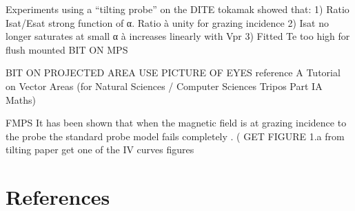 \documentclass[12pt]{article}
\begin{document}
Experiments using a “tilting probe” on
the DITE tokamak showed that:
1) Ratio Isat/Esat strong function of α.
Ratio à unity for grazing incidence
2) Isat no longer saturates at small α à
increases linearly with Vpr
3) Fitted Te too high for flush mounted
BIT ON MPS
 
BIT ON PROJECTED AREA USE PICTURE OF EYES reference A Tutorial on Vector Areas
(for Natural Sciences / Computer Sciences Tripos Part IA Maths) 

FMPS 
It has been shown that when the magnetic field is at grazing incidence to the probe the standard probe model fails completely . (%
GET FIGURE 1.a from tilting paper
get one of the IV curves figures







 






 



\section{References}

\end{document}
